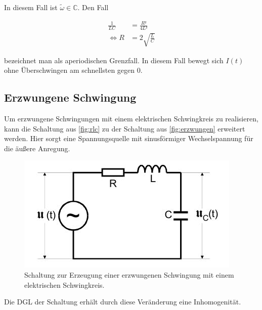 \noindent In diesem Fall ist $\tilde{\omega} \in \mathbb{C}$.
Den Fall

\begin{align*}
\frac{1}{LC} &= \frac{R²}{4L²}\\
\iff R &= 2\sqrt{\frac{L}{C}}
\end{align*}

\noindent bezeichnet man als aperiodischen Grenzfall. In diesem Fall bewegt sich $I(t)$ ohne 
Überschwingen am schnellsten gegen 0. 
\subsection{Erzwungene Schwingung}
Um erzwungene Schwingungen mit einem elektrischen Schwingkreis zu realisieren, kann die Schaltung aus \autoref{fig:rlc} zu der Schaltung aus \autoref{fig:erzwungen} erweitert werden. Hier sorgt eine Spannungsquelle mit sinusförmiger Wechselspannung für die äußere Anregung.
\begin{figure}[H]
    \centering
    \includegraphics{bilder/erzwungen.JPG}
    \caption{Schaltung zur Erzeugung einer erzwungenen Schwingung mit einem elektrischen Schwingkreis. \cite{sample}}
    \label{fig:erzwungen}
  \end{figure}
\noindent
Die DGL der Schaltung erhält durch diese Veränderung eine Inhomogenität.